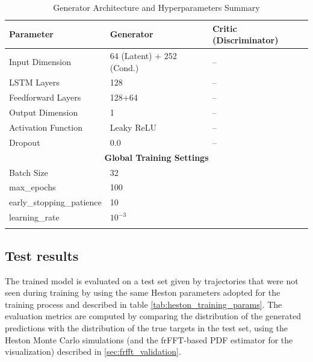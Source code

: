 \begin{table}[H]
\centering
\caption{Generator Architecture and Hyperparameters Summary}
\label{tab:srforgan_architecture}
\begin{tabular}{lll}
\hline
\textbf{Parameter}         & \textbf{Generator}                  & \textbf{Critic (Discriminator)} \\ \hline
Input Dimension            & 64 (Latent) + 252 (Cond.)           & --                              \\
LSTM Layers                & 128                                 & --                              \\
Feedforward Layers         & 128+64                                 & --                              \\
Output Dimension           & 1                                  & --                              \\
Activation Function        & Leaky ReLU                         & --                              \\
Dropout                    & 0.0                                & --                              \\
\multicolumn{3}{c}{\textbf{Global Training Settings}}                                      \\ \hline
Batch Size                 & \multicolumn{2}{l}{32}                                            \\
max\_epochs                & \multicolumn{2}{l}{100}                                          \\
early\_stopping\_patience & \multicolumn{2}{l}{10}                                           \\
learning\_rate            & \multicolumn{2}{l}{$10^{-3}$}                           \\         \\
\hline
\end{tabular}
\end{table}



\subsection{Test results}
The trained model is evaluated on a test set given by  trajectories that were not seen during training by using the same Heston parameters adopted for the training process and described in table \ref{tab:heston_training_params}. 
The evaluation metrics are computed by comparing the distribution of the generated predictions with the distribution of the true targets in the test set, using the Heston Monte Carlo simulations (and the frFFT-based PDF estimator for the visualization) described in \ref{sec:frfft_validation}.\\

